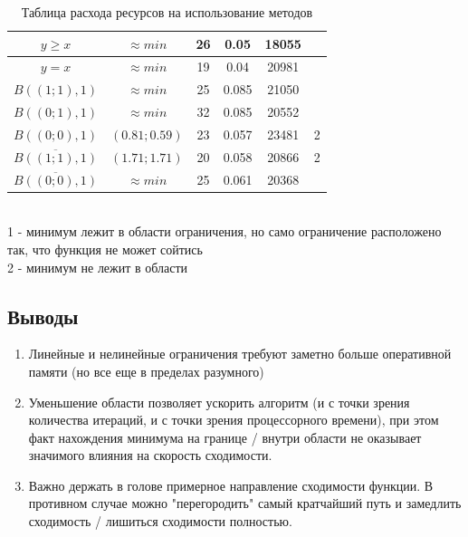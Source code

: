 \documentclass[a4paper,14pt,oneside,openany]{memoir}
\begin{document}
\begin{table}
\begin{tabular}{|c|c|c|c|c|c| }
	\hline
	$y \ge x$ & $\approx min$ & 26 & 0.05 & 18055 &  \\
	\hline
	$y = x$ & $\approx min$ & 19 & 0.04 & 20981 & \\
	\hline
	$B((1; 1), 1)$ & $\approx min$ & 25 & 0.085 & 21050 & \\
	\hline
	$B((0; 1), 1)$ & $\approx min$ & 32 & 0.085 & 20552 & \\
	\hline
	$B((0; 0), 1)$ & $(0.81; 0.59)$ & 23 & 0.057 & 23481 & 2 \\
	\hline
	$\overline{B((1; 1), 1)} $ & $(1.71; 1.71)$ & 20 & 0.058 & 20866 & 2 \\
	\hline
	$\overline{B((0; 0), 1)}$ & $\approx min$ & 25 & 0.061 & 20368 &  \\
	\hline
\end{tabular} \\
\small{1 - минимум лежит в области ограничения, но само ограничение расположено так, что функция не может сойтись}\\
\small{2 - минимум не лежит в области}\\
\caption{Таблица расхода ресурсов на использование методов}
\end{table}
\FloatBarrier
\subsection{Выводы}
\begin{enumerate}
\item Линейные и нелинейные ограничения требуют заметно больше оперативной памяти (но все еще в пределах разумного)
\item Уменьшение области позволяет ускорить алгоритм (и с точки зрения количества итераций, и с точки зрения процессорного времени), при этом факт нахождения минимума на границе / внутри области не оказывает значимого влияния на скорость сходимости.
\item Важно держать в голове примерное направление сходимости функции. В противном случае можно "перегородить" самый кратчайший путь и замедлить сходимость / лишиться сходимости полностью.
\end{enumerate}
\end{document}
